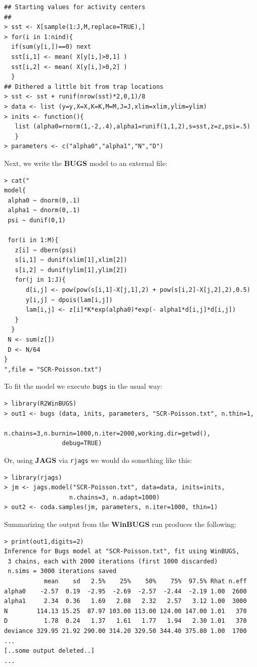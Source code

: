 {\small
\begin{verbatim}
## Starting values for activity centers
##
> sst <- X[sample(1:J,M,replace=TRUE),] 
> for(i in 1:nind){
  if(sum(y[i,])==0) next
  sst[i,1] <- mean( X[y[i,]>0,1] )
  sst[i,2] <- mean( X[y[i,]>0,2] )
  }
## Dithered a little bit from trap locations
> sst <- sst + runif(nrow(sst)*2,0,1)/8
> data <- list (y=y,X=X,K=K,M=M,J=J,xlim=xlim,ylim=ylim)
> inits <- function(){
   list (alpha0=rnorm(1,-2,.4),alpha1=runif(1,1,2),s=sst,z=z,psi=.5)
   }
> parameters <- c("alpha0","alpha1","N","D")
\end{verbatim}
}
Next, we write the {\bf BUGS} model to an external file:
{\small
\begin{verbatim}
> cat("
model{
 alpha0 ~ dnorm(0,.1)
 alpha1 ~ dnorm(0,.1)
 psi ~ dunif(0,1)

 for(i in 1:M){
   z[i] ~ dbern(psi)
   s[i,1] ~ dunif(xlim[1],xlim[2])
   s[i,2] ~ dunif(ylim[1],ylim[2])
   for(j in 1:J){
      d[i,j] <- pow(pow(s[i,1]-X[j,1],2) + pow(s[i,2]-X[j,2],2),0.5)
      y[i,j] ~ dpois(lam[i,j])
      lam[i,j] <- z[i]*K*exp(alpha0)*exp(- alpha1*d[i,j]*d[i,j])
   }
  }
 N <- sum(z[])
 D <- N/64
}
",file = "SCR-Poisson.txt")
\end{verbatim}
}
To fit the model we execute \mbox{\tt bugs} in the usual way:
{\small
\begin{verbatim}
> library(R2WinBUGS)
> out1 <- bugs (data, inits, parameters, "SCR-Poisson.txt", n.thin=1,
                n.chains=3,n.burnin=1000,n.iter=2000,working.dir=getwd(),
                debug=TRUE)
\end{verbatim}
}
{\flushleft Or, using {\bf JAGS} via \mbox{\tt rjags} we would do
  something like this:}
{\small
\begin{verbatim}
> library(rjags)
> jm <- jags.model("SCR-Poisson.txt", data=data, inits=inits,
                  n.chains=3, n.adapt=1000)
> out2 <- coda.samples(jm, parameters, n.iter=1000, thin=1)
\end{verbatim}
}
{\flushleft
Summarizing } the output from the {\bf WinBUGS}  run produces the following:
{\small
\begin{verbatim}
> print(out1,digits=2)
Inference for Bugs model at "SCR-Poisson.txt", fit using WinBUGS,
 3 chains, each with 2000 iterations (first 1000 discarded)
 n.sims = 3000 iterations saved
           mean    sd   2.5%    25%    50%    75%  97.5% Rhat n.eff
alpha0    -2.57  0.19  -2.95  -2.69  -2.57  -2.44  -2.19 1.00  2600
alpha1     2.34  0.36   1.69   2.08   2.32   2.57   3.12 1.00  3000
N        114.13 15.25  87.97 103.00 113.00 124.00 147.00 1.01   370
D          1.78  0.24   1.37   1.61   1.77   1.94   2.30 1.01   370
deviance 329.95 21.92 290.00 314.20 329.50 344.40 375.80 1.00  1700
...
[..some output deleted..]
...
\end{verbatim}
}

